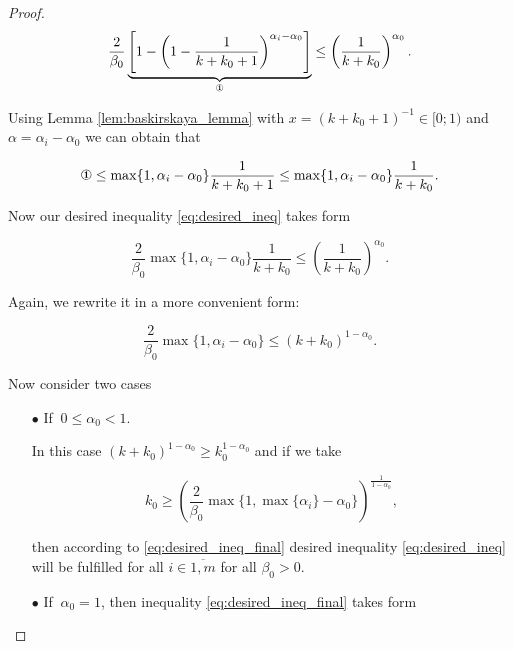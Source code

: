 \begin{proof}
        \begin{equation*}
            \frac{2}{\beta_0}\underbrace{ \left[  1 - \left( 1 - \frac{1}{k + k_0 + 1}\right)^{\alpha_i - \alpha_0} \right]}_{\circledOne} \leq \left( \frac{1}{k+k_0}\right)^{\alpha_0}.
        \end{equation*}

        Using Lemma \ref{lem:baskirskaya_lemma} with $x = (k + k_0 + 1)^{-1} \in [0; 1)$ and $\alpha = \alpha_i - \alpha_0$ we can obtain that

        \begin{equation*}
            \circledOne \leq \max\{1, \alpha_i - \alpha_0\} \frac{1}{k+k_0 + 1} \leq \max\{1, \alpha_i - \alpha_0\} \frac{1}{k + k_0}.
        \end{equation*}

        Now our desired inequality \eqref{eq:desired_ineq} takes form 

        \begin{equation*}
            \frac{2}{\beta_0} \max\{1, \alpha_i - \alpha_0\} \frac{1}{k + k_0} \leq \left( \frac{1}{k+k_0}\right)^{\alpha_0}.
        \end{equation*}

        Again, we rewrite it in a more convenient form:

        \begin{equation}
        \label{eq:desired_ineq_final}
            \frac{2}{\beta_0} \max\{1, \alpha_i - \alpha_0\} \leq (k + k_0)^{1 - \alpha_0}.
        \end{equation}

        Now consider two cases

        \begin{enumerate}
            \item[$\bullet$] If $~0 \leq \alpha_0 < 1$.

            In this case $(k + k_0)^{1 - \alpha_0} \geq k_0^{1 - \alpha_0}$ and if we take

            \begin{equation*}
                k_0 \geq \left( \frac{2}{\beta_0} \max\{1, \max\{\alpha_i\} - \alpha_0\} \right)^{\frac{1}{1 - \alpha_0}},
            \end{equation*}

            then according to \eqref{eq:desired_ineq_final} desired inequality \eqref{eq:desired_ineq} will be fulfilled for all $i \in \overline{1, m}$ for all $\beta_0 > 0$. 

            \item[$\bullet$] If $~\alpha_0 = 1$, then inequality \eqref{eq:desired_ineq_final} takes form


\end{enumerate}
\end{proof}
